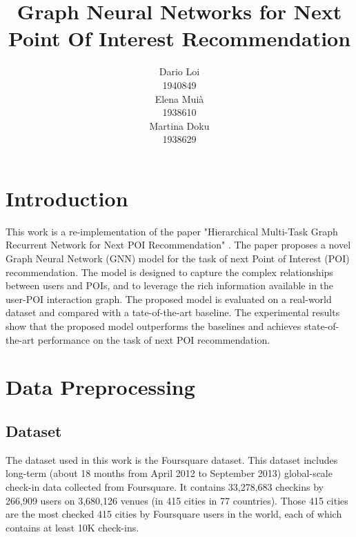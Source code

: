 \documentclass[twocolumn]{article}
\title{Graph Neural Networks for Next Point Of Interest Recommendation
}
\author{
  Dario Loi\\
  1940849\\
   \And
  Elena Muià \\
  1938610 \\
  \And
  Martina Doku \\
  1938629\\
}
\begin{document}


\section{Introduction}
This work is a re-implementation of the paper "Hierarchical Multi-Task Graph Recurrent Network for Next POI Recommendation" \cite{main_paper}. 
The paper proposes a novel Graph Neural Network (GNN) model for the task of 
next Point of Interest (POI) recommendation. The model is designed to 
capture the complex relationships between users and POIs, and to 
leverage the rich information available in the user-POI interaction 
graph. The proposed model is evaluated on a real-world dataset and 
compared with a tate-of-the-art baseline. The experimental results
 show that the proposed model outperforms the baselines and 
 achieves state-of-the-art performance on the task of next POI recommendation.


\section{Data Preprocessing}
\subsection{Dataset}
The dataset used in this work is the Foursquare dataset\cite{foursquare}. This dataset includes
 long-term (about 18 months from April 2012 to September 2013) global-scale 
 check-in data collected from Foursquare. It contains 33,278,683 checkins by 
 266,909 users on 3,680,126 venues (in 415 cities in 77 countries). 
 Those 415 cities are the most checked 415 cities by Foursquare users in the world, 
 each of which contains at least 10K check-ins.
\end{document}
